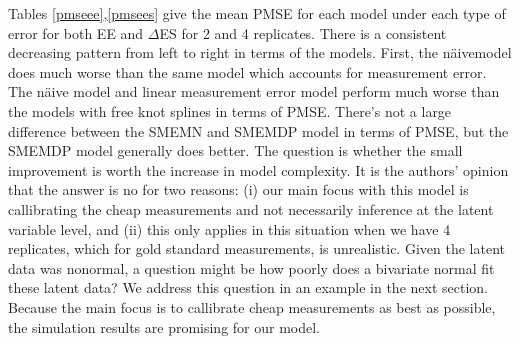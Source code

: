 \documentclass[11pt]{article}\usepackage[]{graphicx}\usepackage[]{color}
\begin{document}
Tables \ref{pmseee},\ref{pmsees} give the mean PMSE for each model under each type of error for both EE and $\Delta$ES for 2 and 4 replicates. There is a consistent decreasing pattern from left to right in terms of the models. First, the n{\"a}ivemodel does much worse than the same model which accounts for measurement error. The n{\"a}ive model and linear measurement error model perform much worse than the models with free knot splines in terms of PMSE. There's not a large difference between the SMEMN and SMEMDP model in terms of PMSE, but the SMEMDP model generally does better. The question is whether the small improvement is worth the increase in model complexity. It is the authors' opinion that the answer is no for two reasons: (i) our main focus with this model is callibrating the cheap measurements and not necessarily inference at the latent variable level, and (ii) this only applies in this situation when we have 4 replicates, which for gold standard measurements, is unrealistic. Given the latent data was nonormal, a question might be how poorly does a bivariate normal fit these latent data? We address this question in an example in the next section. Because the main focus is to callibrate cheap measurements as best as possible, the simulation results are promising for our model.


\clearpage
{} %
\thispagestyle{empty}
\end{document}
